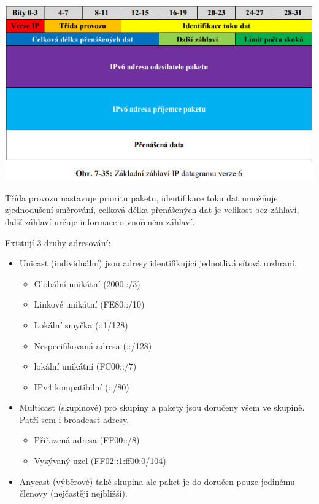\begin{center}
	\includegraphics[scale=0.5]{images/-046.png}
\end{center}

Třída provozu nastavuje prioritu paketu, identifikace toku dat umožňuje zjednodušení směrování, celková délka přenášených dat je velikost bez záhlaví, další záhlaví určuje informace o vnořeném záhlaví.

Existují 3 druhy adresování:
\begin{itemize}[noitemsep]
    \item Unicast (individuální) jsou adresy identifikující jednotlivá síťová rozhraní.
    \begin{itemize}[noitemsep]
        \item Globální unikátní (2000::/3)
        \item Linkové unikátní (FE80::/10)
        \item Lokální smyčka (::1/128)
        \item Nespecifikovaná adresa (::/128)
        \item lokální unikátní (FC00::/7)
        \item IPv4 kompatibilní (::/80)
    \end{itemize}
    \item Multicast (skupinové) pro skupiny a pakety jsou doručeny všem ve skupině. Patří sem i broadcast adresy.
    \begin{itemize}[noitemsep]
        \item Přiřazená adresa (FF00::/8)
        \item Vyzývaný uzel (FF02::1:ff00:0/104)
    \end{itemize}
    \item Anycast (výběrové) také skupina ale paket je do doručen pouze jedinému členovy (nejčastěji nejbližší).
\end{itemize}

